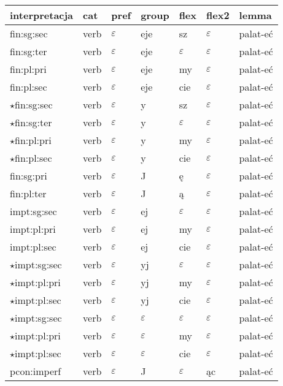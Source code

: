 \documentclass{article}
\begin{document}
\begin{longtable}{p{7cm}|l|l|l|l|l|l}
interpretacja & cat & pref & group & flex & flex2 & lemma\\
\hline
fin:sg:sec & verb & $\varepsilon$ & eje & sz & $\varepsilon$ & palat-eć\\
fin:sg:ter & verb & $\varepsilon$ & eje & $\varepsilon$ & $\varepsilon$ & palat-eć\\
fin:pl:pri & verb & $\varepsilon$ & eje & my & $\varepsilon$ & palat-eć\\
fin:pl:sec & verb & $\varepsilon$ & eje & cie & $\varepsilon$ & palat-eć\\
$\star$fin:sg:sec & verb & $\varepsilon$ & y & sz & $\varepsilon$ & palat-eć\\
$\star$fin:sg:ter & verb & $\varepsilon$ & y & $\varepsilon$ & $\varepsilon$ & palat-eć\\
$\star$fin:pl:pri & verb & $\varepsilon$ & y & my & $\varepsilon$ & palat-eć\\
$\star$fin:pl:sec & verb & $\varepsilon$ & y & cie & $\varepsilon$ & palat-eć\\
fin:sg:pri & verb & $\varepsilon$ & J & ę & $\varepsilon$ & palat-eć\\
fin:pl:ter & verb & $\varepsilon$ & J & ą & $\varepsilon$ & palat-eć\\
impt:sg:sec & verb & $\varepsilon$ & ej & $\varepsilon$ & $\varepsilon$ & palat-eć\\
impt:pl:pri & verb & $\varepsilon$ & ej & my & $\varepsilon$ & palat-eć\\
impt:pl:sec & verb & $\varepsilon$ & ej & cie & $\varepsilon$ & palat-eć\\
$\star$impt:sg:sec & verb & $\varepsilon$ & yj & $\varepsilon$ & $\varepsilon$ & palat-eć\\
$\star$impt:pl:pri & verb & $\varepsilon$ & yj & my & $\varepsilon$ & palat-eć\\
$\star$impt:pl:sec & verb & $\varepsilon$ & yj & cie & $\varepsilon$ & palat-eć\\
$\star$impt:sg:sec & verb & $\varepsilon$ & $\varepsilon$ & $\varepsilon$ & $\varepsilon$ & palat-eć\\
$\star$impt:pl:pri & verb & $\varepsilon$ & $\varepsilon$ & my & $\varepsilon$ & palat-eć\\
$\star$impt:pl:sec & verb & $\varepsilon$ & $\varepsilon$ & cie & $\varepsilon$ & palat-eć\\
pcon:imperf & verb & $\varepsilon$ & J & $\varepsilon$ & ąc & palat-eć\\

\end{longtable}
\end{document}
